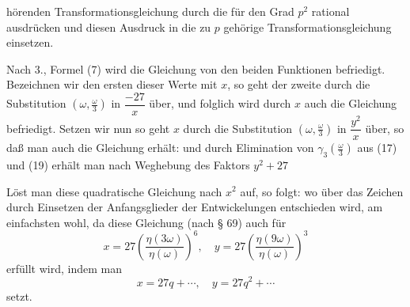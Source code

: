 hörenden Transformationsgleichung durch die für den Grad $p^2$
rational ausdrücken und diesen Ausdruck in die zu $p$ gehörige
Transformationsgleichung einsetzen.

Nach 3., Formel (7) wird die Gleichung
von den beiden Funktionen
befriedigt. Bezeichnen wir den ersten dieser Werte mit $x$, so geht
der zweite durch die Substitution $\left(\omega,\frac{\omega}{3}\right)$
in $\dfrac{-27}{x}$ über, und folglich wird durch $x$ auch die
Gleichung
befriedigt. Setzen wir nun
so geht $x$ durch die Substitution $\left(\omega,\frac{\omega}{3}\right)$
in $\dfrac{y^2}{x}$ über, so daß man auch die Gleichung erhält:
und durch Elimination von $\gamma_3\left(\frac{\omega}{3}\right)$ aus
(17) und (19) erhält man nach Weghebung des Faktors $y^2+27$

Löst man diese quadratische Gleichung nach $x^2$ auf, so folgt:
wo über das Zeichen durch Einsetzen der Anfangsglieder der
Entwickelungen entschieden wird, am einfachsten wohl, da diese
Gleichung (nach § 69) auch für
\[
x = 27\left(\frac{\eta(3\omega)}{\eta(\omega)}\right)^6, \quad y = 27\left(\frac{\eta(9\omega)}{\eta(\omega)}\right)^3
\]
erfüllt wird, indem man
\[
x = 27q + \cdots, \quad y = 27q^2 + \cdots
\]
setzt.
